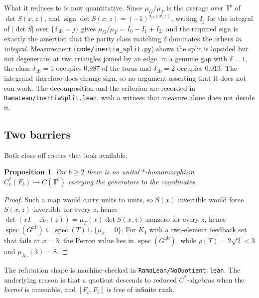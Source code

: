 \documentclass[11pt]{article}
\newtheorem{proposition}[theorem]{Proposition}
\theoremstyle{remark}
\begin{document}
What it reduces to is now quantitative. Since $\mu_G/\mu_F$ is the average over
$\mathbb T^b$ of $\det S(x,z)$, and $\operatorname{sign}\det S(x,z)=(-1)^{\delta_{\mathrm{ab}}(x,z)}$,
writing $I_j$ for the integral of $|\det S|$ over $\{\delta_{\mathrm{ab}}=j\}$ gives
$\mu_G/\mu_F=I_0-I_1+I_2$, and the required sign is exactly the assertion that the parity
class matching $\delta$ dominates the others \emph{in integral}. Measurement
(\texttt{code/inertia\_split.py}) shows the split is lopsided but not degenerate: at two
triangles joined by an edge, in a genuine gap with $\delta=1$, the class
$\delta_{\mathrm{ab}}=1$ occupies $0.987$ of the torus and $\delta_{\mathrm{ab}}=2$ occupies
$0.013$. The integrand therefore does change sign, so no argument asserting that it does not
can work. The decomposition and the criterion are recorded in
\texttt{RamaLean/InertiaSplit.lean}, with a witness that measure alone does not decide it.

\subsection{Two barriers}

Both close off routes that look available.

\begin{proposition}\label{prop:nohom}
For $b\ge2$ there is no unital $*$-homomorphism $C^*_r(F_b)\to C(\mathbb T^b)$ carrying the
generators to the coordinates.
\end{proposition}

\begin{proof}
Such a map would carry units to units, so $S(x)$ invertible would force $S(x,z)$ invertible
for every $z$, hence $\det(xI-A_G(z))=\mu_F(x)\det S(x,z)$ nonzero for every $z$, hence
$\operatorname{spec}(G^{\mathrm{ab}})\subseteq\operatorname{spec}(T)\cup\{\mu_F=0\}$. For
$K_4$ with a two-element feedback set that fails at $x=3$: the Perron value lies in
$\operatorname{spec}(G^{\mathrm{ab}})$, while $\rho(T)=2\sqrt2<3$ and $\mu_{K_2}(3)=8$.
\end{proof}

The refutation shape is machine-checked in \texttt{RamaLean/NoQuotient.lean}. The underlying
reason is that a quotient descends to reduced $C^*$-algebras when the \emph{kernel} is
amenable, and $[F_b,F_b]$ is free of infinite rank.
\end{document}
